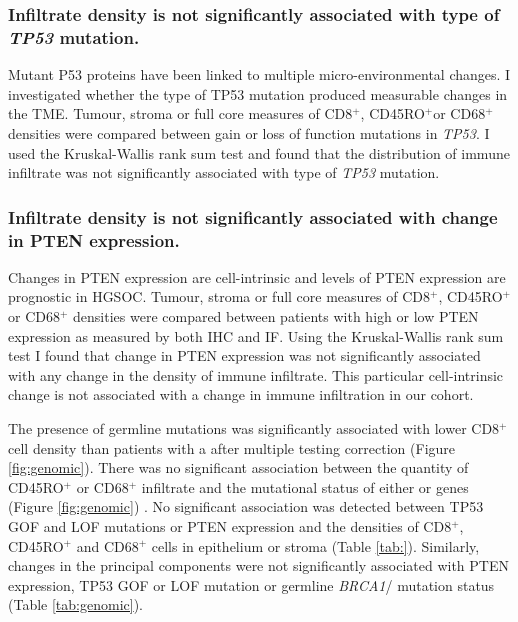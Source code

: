 \subsubsection{Infiltrate density is not significantly associated with type of \textit{TP53} mutation.}
Mutant P53 proteins have been linked to multiple micro-environmental changes\cite{Cordani2016}. I investigated whether the type of TP53 mutation produced measurable changes in the TME. Tumour, stroma or full core measures of CD8$^+$, CD45RO$^+$or CD68$^+$densities were compared between gain or loss of function mutations in \textit{TP53}. I used the Kruskal-Wallis rank sum test and found that the distribution of immune infiltrate was not significantly associated with type of \textit{TP53} mutation.

\subsubsection{Infiltrate density is not significantly associated with change in PTEN expression.}
Changes in PTEN expression are cell-intrinsic and levels of PTEN expression are prognostic in HGSOC\cite{RN17, RN15}. Tumour, stroma or full core measures of CD8$^+$, CD45RO$^+$ or CD68$^+$ densities were compared between patients with high or low PTEN expression as measured by both IHC and IF. Using the Kruskal-Wallis rank sum test I found that change in PTEN expression was not significantly associated with any change in the density of immune infiltrate. This particular cell-intrinsic change is not associated with a change in immune infiltration in our cohort.

The presence of germline  mutations was significantly associated with lower CD8$^+$ cell density than patients with a  after multiple testing correction (Figure \ref{fig:genomic}). There was no significant association between the quantity of CD45RO$^+$ or CD68$^+$ infiltrate and the mutational status of either  or  genes (Figure \ref{fig:genomic}) . No significant association was detected between TP53 GOF and LOF mutations or PTEN expression and the densities of CD8$^+$, CD45RO$^+$ and CD68$^+$ cells in epithelium or stroma (Table \ref{tab:}). Similarly, changes in the principal components were not significantly associated with PTEN expression, TP53 GOF or LOF mutation or germline \textit{BRCA1}/ mutation status (Table \ref{tab:genomic}). 




